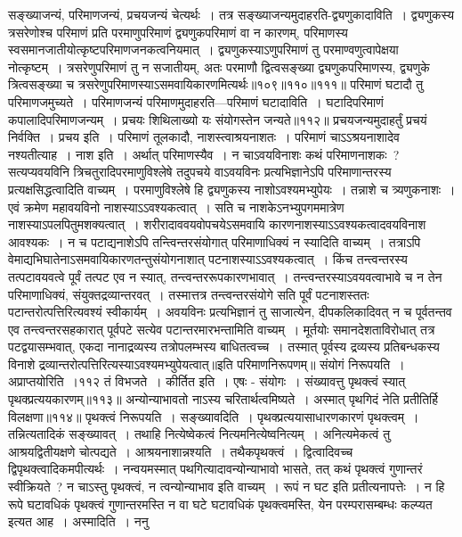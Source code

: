 सङ्ख्याजन्यं, परिमाणजन्यं, प्रचयजन्यं चेत्यर्थः~।
तत्र सङ्ख्याजन्यमुदाहरति-द्व्यणुकादाविति~। द्व्यणुकस्य त्रसरेणोश्च परिमाणं प्रति परमाणुपरिमाणं द्व्यणुकपरिमाणं वा न कारणम्, परिमाणस्य
स्वसमानजातीयोत्कृष्टपरिमाणजनकत्वनियमात्~। द्व्यणुकस्याऽणुपरिमाणं तु परमाण्वणुत्वापेक्षया नोत्कृष्टम्~। त्रसरेणुपरिमाणं तु न सजातीयम्, अतः परमाणौ द्वित्वसङ्ख्या
द्व्यणुकपरिमाणस्य, द्व्यणुके त्रित्वसङ्ख्या च त्रसरेणुपरिमाणस्याऽसमवायिकारणमित्यर्थः॥१०९॥११०॥१११॥
परिमाणं घटादौ तु परिमाणजमुच्यते~।
परिमाणजन्यं परिमाणमुदाहरति---परिमाणं घटादाविति~। घटादिपरिमाणं कपालादिपरिमाणजन्यम्~।
प्रचयः शिथिलाख्यो यः संयोगस्तेन जन्यते॥११२॥
प्रचयजन्यमुदाहर्तुं प्रचयं निर्वक्ति~। प्रचय इति~।
परिमाणं तूलकादौ, नाशस्त्वाश्रयनाशतः~।
परिमाणं चाऽऽश्रयनाशादेव नश्यतीत्याह~। नाश इति~। अर्थात् परिमाणस्यैव~। न चाऽवयविनाशः कथं परिमाणनाशकः~? सत्यप्यवयविनि त्रिचतुरादिपरमाणुविश्लेषे
तदुपचये वाऽवयविनः प्रत्यभिज्ञानेऽपि परिमाणान्तरस्य प्रत्यक्षसिद्धत्वादिति वाच्यम्~। परमाणुविश्लेषे हि द्व्यणुकस्य नाशोऽवश्यमभ्युपेयः~। तन्नाशे च त्र्यणुकनाशः~। एवं
क्रमेण महावयविनो नाशस्याऽऽवश्यकत्वात्~। सति च नाशकेऽनभ्युपगममात्रेण नाशस्याऽपलपितुमशक्यत्वात्~। शरीरादाववयवोपचयेऽसमवायि
कारणनाशस्याऽऽवश्यकत्वादवयविनाश आवश्यकः~। न च पटाद्यनाशेऽपि तन्त्विन्तरसंयोगात् परिमाणाधिक्यं न स्यादिति वाच्यम्~। तत्राऽपि
वेमाद्यभिघातेनाऽसमवायिकारणतन्तुसंयोगनाशात् पटनाशस्याऽऽवश्यकत्वात्~। किंच तन्त्वन्तरस्य तत्पटावयवत्वे पूर्वं तत्पट एव न स्यात्, तन्त्वन्तररूपकारणभावात्~।
तन्त्वन्तरस्याऽवयवत्वाभावे च न तेन परिमाणाधिक्यं, संयुक्तद्रव्यान्तरवत्~। तस्मात्तत्र तन्त्वन्तरसंयोगे सति पूर्वं पटनाशस्ततः पटान्तरोत्पत्तिरित्यवश्यं स्वीकार्यम्~।
अवयविनः प्रत्यभिज्ञानं तु साजात्येन, दीपकलिकादिवत् न च पूर्वतन्तव एव तन्त्वन्तरसहकारात् पूर्वपटे सत्येव पटान्तरमारभन्तामिति वाच्यम्~। मूर्तयोः समानदेशताविरोधात्
तत्र पटद्वयासम्भवात्, एकदा नानाद्रव्यस्य तत्रोपलम्भस्य बाधितत्वच्च~। तस्मात् पूर्वस्य द्रव्यस्य प्रतिबन्धकस्य विनाशे द्रव्यान्तरोत्पत्तिरित्यस्याऽवश्यमभ्युपेयत्वात्॥इति
परिमाणनिरूपणम्॥
संयोगं निरूपयति~। अप्राप्तयोरिति~।११२
तं विभजते~। कीर्तित इति~। एषः - संयोगः~।
संख्यावत्तु पृथक्त्वं स्यात् पृथक्प्रत्ययकारणम्॥११३॥
अन्योन्याभावतो नाऽस्य चरितार्थत्वमिष्यते~।
अस्मात् पृथगिदं नेति प्रतीतिर्हि विलक्षणा॥११४॥
पृथक्त्वं निरूपयति~। सङ्ख्यावदिति~। पृथक्प्रत्ययासाधारणकारणं पृथक्त्वम्~। तन्नित्यतादिकं सङ्ख्यावत्~। तथाहि नित्येष्वेकत्वं नित्यमनित्येष्वनित्यम्~। अनित्यमेकत्वं
तु आश्रयद्वितीयक्षणे चोत्पद्यते~। आश्रयनाशान्नश्यति~। तथैकपृथक्त्वं~। द्वित्वादिवच्च द्विपृथक्त्वादिकमपीत्यर्थः~।
नन्वयमस्मात् पथगित्यादावन्योन्याभावो भासते, तत् कथं पृथक्त्वं गुणान्तरं स्वीक्रियते~? न चाऽस्तु पृथक्त्वं, न त्वन्योन्याभाव इति वाच्यम्~। रूपं न घट इति
प्रतीत्यनापत्तेः~। न हि रूपे घटावधिकं पृथक्त्वं गुणान्तरमस्ति न वा घटे घटावधिकं पृथक्त्वमस्ति, येन परम्परासम्बम्धः कल्प्यत इत्यत आह~। अस्मादिति~। ननु
